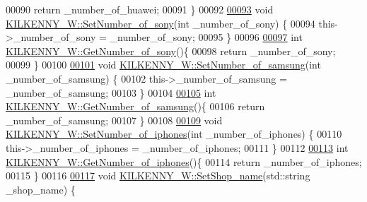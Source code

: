 \begin{DoxyCode}
00090     \textcolor{keywordflow}{return} \_number\_of\_huawei;
00091 \}
00092 
\hypertarget{_k_i_l_k_e_n_n_y___w_8cpp_source.tex_l00093}{}\hyperlink{class_k_i_l_k_e_n_n_y___w_a6edadc355823944f30b94039abed1c9a}{00093} \textcolor{keywordtype}{void} \hyperlink{class_k_i_l_k_e_n_n_y___w_a6edadc355823944f30b94039abed1c9a}{KILKENNY\_W::SetNumber\_of\_sony}(\textcolor{keywordtype}{int} \_number\_of\_sony) \{
00094     this->\_number\_of\_sony = \_number\_of\_sony;
00095 \}
00096 
\hypertarget{_k_i_l_k_e_n_n_y___w_8cpp_source.tex_l00097}{}\hyperlink{class_k_i_l_k_e_n_n_y___w_a804254083a84b05b320e5723c0568e6f}{00097} \textcolor{keywordtype}{int} \hyperlink{class_k_i_l_k_e_n_n_y___w_a804254083a84b05b320e5723c0568e6f}{KILKENNY\_W::GetNumber\_of\_sony}()\{
00098     \textcolor{keywordflow}{return} \_number\_of\_sony;
00099 \}
00100 
\hypertarget{_k_i_l_k_e_n_n_y___w_8cpp_source.tex_l00101}{}\hyperlink{class_k_i_l_k_e_n_n_y___w_ac9ba94018b97ae9be58bde2690965612}{00101} \textcolor{keywordtype}{void} \hyperlink{class_k_i_l_k_e_n_n_y___w_ac9ba94018b97ae9be58bde2690965612}{KILKENNY\_W::SetNumber\_of\_samsung}(\textcolor{keywordtype}{int} \_number\_of\_samsung) \{
00102     this->\_number\_of\_samsung = \_number\_of\_samsung;
00103 \}
00104 
\hypertarget{_k_i_l_k_e_n_n_y___w_8cpp_source.tex_l00105}{}\hyperlink{class_k_i_l_k_e_n_n_y___w_ac73e56bbdb3915546b8774f260edc30e}{00105} \textcolor{keywordtype}{int} \hyperlink{class_k_i_l_k_e_n_n_y___w_ac73e56bbdb3915546b8774f260edc30e}{KILKENNY\_W::GetNumber\_of\_samsung}()\{
00106     \textcolor{keywordflow}{return} \_number\_of\_samsung;
00107 \}
00108 
\hypertarget{_k_i_l_k_e_n_n_y___w_8cpp_source.tex_l00109}{}\hyperlink{class_k_i_l_k_e_n_n_y___w_abdea4a1698ad841e4d758e6b3e3bef62}{00109} \textcolor{keywordtype}{void} \hyperlink{class_k_i_l_k_e_n_n_y___w_abdea4a1698ad841e4d758e6b3e3bef62}{KILKENNY\_W::SetNumber\_of\_iphones}(\textcolor{keywordtype}{int} \_number\_of\_iphones) \{
00110     this->\_number\_of\_iphones = \_number\_of\_iphones;
00111 \}
00112 
\hypertarget{_k_i_l_k_e_n_n_y___w_8cpp_source.tex_l00113}{}\hyperlink{class_k_i_l_k_e_n_n_y___w_aa8eb9ca20372744a05ab64def268a940}{00113} \textcolor{keywordtype}{int} \hyperlink{class_k_i_l_k_e_n_n_y___w_aa8eb9ca20372744a05ab64def268a940}{KILKENNY\_W::GetNumber\_of\_iphones}()\{
00114     \textcolor{keywordflow}{return} \_number\_of\_iphones;
00115 \}
00116 
\hypertarget{_k_i_l_k_e_n_n_y___w_8cpp_source.tex_l00117}{}\hyperlink{class_k_i_l_k_e_n_n_y___w_a8670e50802ffeb6a8b4c148c4f5183aa}{00117} \textcolor{keywordtype}{void} \hyperlink{class_k_i_l_k_e_n_n_y___w_a8670e50802ffeb6a8b4c148c4f5183aa}{KILKENNY\_W::SetShop\_name}(std::string \_shop\_name) \{

\end{DoxyCode}
